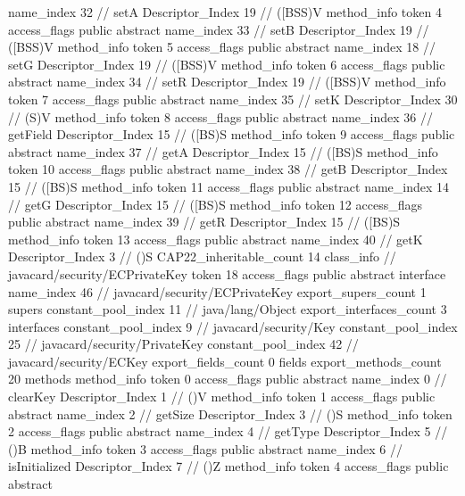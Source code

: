 {{{{{					name_index	32		// setA
					Descriptor_Index	19		// ([BSS)V
				}
				method_info {
					token	4
					access_flags	public abstract
					name_index	33		// setB
					Descriptor_Index	19		// ([BSS)V
				}
				method_info {
					token	5
					access_flags	public abstract
					name_index	18		// setG
					Descriptor_Index	19		// ([BSS)V
				}
				method_info {
					token	6
					access_flags	public abstract
					name_index	34		// setR
					Descriptor_Index	19		// ([BSS)V
				}
				method_info {
					token	7
					access_flags	public abstract
					name_index	35		// setK
					Descriptor_Index	30		// (S)V
				}
				method_info {
					token	8
					access_flags	public abstract
					name_index	36		// getField
					Descriptor_Index	15		// ([BS)S
				}
				method_info {
					token	9
					access_flags	public abstract
					name_index	37		// getA
					Descriptor_Index	15		// ([BS)S
				}
				method_info {
					token	10
					access_flags	public abstract
					name_index	38		// getB
					Descriptor_Index	15		// ([BS)S
				}
				method_info {
					token	11
					access_flags	public abstract
					name_index	14		// getG
					Descriptor_Index	15		// ([BS)S
				}
				method_info {
					token	12
					access_flags	public abstract
					name_index	39		// getR
					Descriptor_Index	15		// ([BS)S
				}
				method_info {
					token	13
					access_flags	public abstract
					name_index	40		// getK
					Descriptor_Index	3		// ()S
				}
			}
			CAP22_inheritable_count	14
		}
		class_info {		// javacard/security/ECPrivateKey
			token	18
			access_flags	public abstract interface
			name_index	46		// javacard/security/ECPrivateKey
			export_supers_count	1
			supers {
				constant_pool_index	11		// java/lang/Object
			}
			export_interfaces_count	3
			interfaces {
				constant_pool_index	9		// javacard/security/Key
				constant_pool_index	25		// javacard/security/PrivateKey
				constant_pool_index	42		// javacard/security/ECKey
			}
			export_fields_count	0
			fields {
			}
			export_methods_count	20
			methods {
				method_info {
					token	0
					access_flags	public abstract
					name_index	0		// clearKey
					Descriptor_Index	1		// ()V
				}
				method_info {
					token	1
					access_flags	public abstract
					name_index	2		// getSize
					Descriptor_Index	3		// ()S
				}
				method_info {
					token	2
					access_flags	public abstract
					name_index	4		// getType
					Descriptor_Index	5		// ()B
				}
				method_info {
					token	3
					access_flags	public abstract
					name_index	6		// isInitialized
					Descriptor_Index	7		// ()Z
				}
				method_info {
					token	4
					access_flags	public abstract
}}}}}
